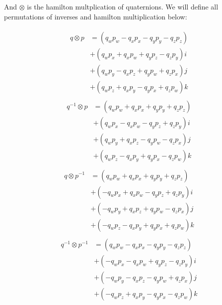 \documentclass{article}
\begin{document}
And $\otimes$ is the hamilton multplication of quaternions.  We will define all permutations of inverses and hamilton multiplication below:

\begin{align}
    \begin{split}
        q \otimes p &= (q_wp_w - q_xp_x - q_yp_y - q_zp_z) \\
                    &+ (q_wp_x + q_xp_w + q_yp_z - q_zp_y)i \\
                    &+ (q_wp_y - q_xp_z + q_yp_w + q_zp_x)j \\
                    &+ (q_wp_z + q_xp_y - q_yp_x + q_zp_w)k
    \end{split}
\end{align}
\begin{align}
    \begin{split}
        q^{-1} \otimes p &= (q_wp_w + q_xp_x + q_yp_y + q_zp_z) \\
                         &+ (q_wp_x - q_xp_w - q_yp_z + q_zp_y)i \\
                         &+ (q_wp_y + q_xp_z - q_yp_w - q_zp_x)j \\
                         &+ (q_wp_z - q_xp_y + q_yp_x - q_zp_w)k
    \end{split}
\end{align}
\begin{align}
    \begin{split}
        q \otimes p^{-1} &= (q_wp_w + q_xp_x + q_yp_y + q_zp_z) \\
                         &+ (-q_wp_x + q_xp_w - q_yp_z + q_zp_y)i \\
                         &+ (-q_wp_y + q_xp_z + q_yp_w - q_zp_x)j \\
                         &+ (-q_wp_z - q_xp_y + q_yp_x + q_zp_w)k
    \end{split}
\end{align}
\begin{align}
    \begin{split}
        q^{-1} \otimes p^{-1} &= (q_wp_w - q_xp_x - q_yp_y - q_zp_z) \\
                              &+ (-q_wp_x - q_xp_w + q_yp_z - q_zp_y)i \\
                              &+ (-q_wp_y - q_xp_z - q_yp_w + q_zp_x)j \\
                              &+ (-q_wp_z + q_xp_y - q_yp_x - q_zp_w)k
    \end{split}
\end{align}
\end{document}
